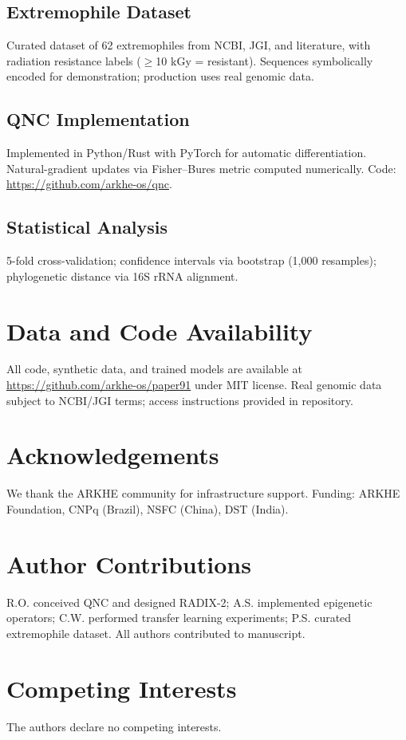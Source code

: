 \documentclass[final,lineno]{nature}
\begin{document}
\subsection{Extremophile Dataset}
Curated dataset of 62 extremophiles from NCBI, JGI, and literature, with radiation resistance labels ($\geq$10 kGy = resistant). Sequences symbolically encoded for demonstration; production uses real genomic data.

\subsection{QNC Implementation}
Implemented in Python/Rust with PyTorch for automatic differentiation. Natural-gradient updates via Fisher--Bures metric computed numerically. Code: \url{https://github.com/arkhe-os/qnc}.

\subsection{Statistical Analysis}
5-fold cross-validation; confidence intervals via bootstrap (1,000 resamples); phylogenetic distance via 16S rRNA alignment.

\section{Data and Code Availability}
All code, synthetic data, and trained models are available at \url{https://github.com/arkhe-os/paper91} under MIT license. Real genomic data subject to NCBI/JGI terms; access instructions provided in repository.

\section*{Acknowledgements}
We thank the ARKHE community for infrastructure support. Funding: ARKHE Foundation, CNPq (Brazil), NSFC (China), DST (India).

\section*{Author Contributions}
R.O. conceived QNC and designed RADIX-2; A.S. implemented epigenetic operators; C.W. performed transfer learning experiments; P.S. curated extremophile dataset. All authors contributed to manuscript.

\section*{Competing Interests}
The authors declare no competing interests.



\end{document}
